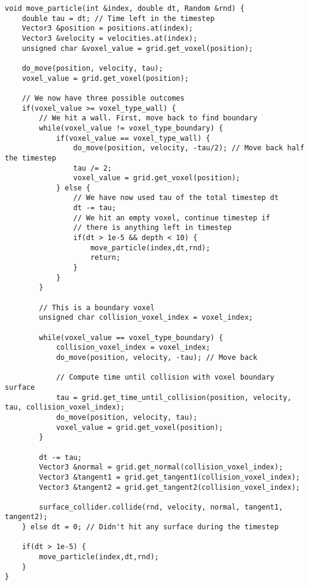 \begin{lstlisting}[caption=The collision detection algorithm., label=lst:dsmc_collision_detection]
void move_particle(int &index, double dt, Random &rnd) {
    double tau = dt; // Time left in the timestep
    Vector3 &position = positions.at(index);
    Vector3 &velocity = velocities.at(index);
    unsigned char &voxel_value = grid.get_voxel(position);
    
    do_move(position, velocity, tau);
    voxel_value = grid.get_voxel(position);
    
    // We now have three possible outcomes
    if(voxel_value >= voxel_type_wall) {
        // We hit a wall. First, move back to find boundary
        while(voxel_value != voxel_type_boundary) {
            if(voxel_value == voxel_type_wall) {
                do_move(position, velocity, -tau/2); // Move back half the timestep
                tau /= 2;
                voxel_value = grid.get_voxel(position);
            } else {
                // We have now used tau of the total timestep dt
                dt -= tau;
                // We hit an empty voxel, continue timestep if
                // there is anything left in timestep
                if(dt > 1e-5 && depth < 10) {
                    move_particle(index,dt,rnd);
                    return;
                }
            }
        }

        // This is a boundary voxel
        unsigned char collision_voxel_index = voxel_index;
        
        while(voxel_value == voxel_type_boundary) {
            collision_voxel_index = voxel_index;
            do_move(position, velocity, -tau); // Move back

            // Compute time until collision with voxel boundary surface
            tau = grid.get_time_until_collision(position, velocity, tau, collision_voxel_index); 
            do_move(position, velocity, tau);
            voxel_value = grid.get_voxel(position);
        }

        dt -= tau;
        Vector3 &normal = grid.get_normal(collision_voxel_index);
        Vector3 &tangent1 = grid.get_tangent1(collision_voxel_index);
        Vector3 &tangent2 = grid.get_tangent2(collision_voxel_index);

        surface_collider.collide(rnd, velocity, normal, tangent1, tangent2);
    } else dt = 0; // Didn't hit any surface during the timestep

    if(dt > 1e-5) {
        move_particle(index,dt,rnd);
    }
}
\end{lstlisting}
